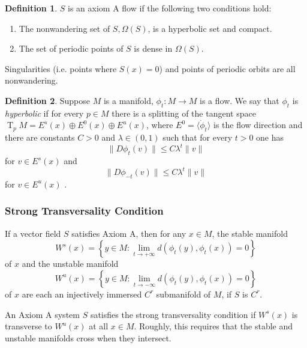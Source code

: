 \documentclass{article}
\theoremstyle{definition}
\newtheorem{definition}{Definition}
\theoremstyle{remark}
\newcommand{\T}{\operatorname{T}}
\newcommand{\TpM}{\T_p\!M}
\newcounter{ct}
\begin{document}
\begin{definition}
$S$ is an axiom A flow if the following two conditions hold:
\begin{enumerate}
\item The nonwandering set of $S, \Omega(S)$, is a hyperbolic set and compact.
\item The set of periodic points of $S$ is dense in $\Omega(S)$.
\end{enumerate}
\end{definition}

Singularities (i.e. points where $S(x)=0$) and points of periodic orbits are all nonwandering.

\begin{definition}
 Suppose $M$ is a manifold, $\phi_t\colon M\rightarrow M$ is a flow.
  We say that $\phi_t$ is \emph{hyperbolic} %
   if for every $p\in M$ there is a splitting of the tangent space $\TpM=E^s(x)\oplus E^0(x)\oplus E^u(x)$, where $E^0=\langle \dot\phi_t\rangle$ is the flow direction and there are constants $C>0$ and $\lambda\in(0,1)$ such that for every $t>0$ one has \[\|D\phi_t(v)\|\leq C\lambda^t\|v\|\]
for $v\in E^s(x)$ and \[\|D\phi_{-t}(v)\|\leq C\lambda^t\|v\|\] for $v\in E^u(x)$ . 
\end{definition}

\subsubsection{Strong Transversality Condition}

If a vector field $S$ satisfies Axiom A, then for any $x \in M$, the stable manifold 
\[W^s(x)=\left\{ y \in M \colon \lim_{t\rightarrow+\infty} d(\phi_t( y), \phi_t(x))=0\right\}\]
of $x$ and the unstable manifold
\[W^u(x)=\left\{ y \in M \colon \lim_{t\rightarrow-\infty} d(\phi_t( y), \phi_t(x))=0\right\}\]
of $x$ are each an injectively immersed $C^r$ submanifold of $M$, if $S$ is $C^r$.

An Axiom A system $S$ satisfies the strong transversality condition if $W^s(x)$ is transverse to $W^u(x)$ at all $x\in M$.
Roughly, this requires that the stable and unstable manifolds cross when they intersect. 
\end{document}
